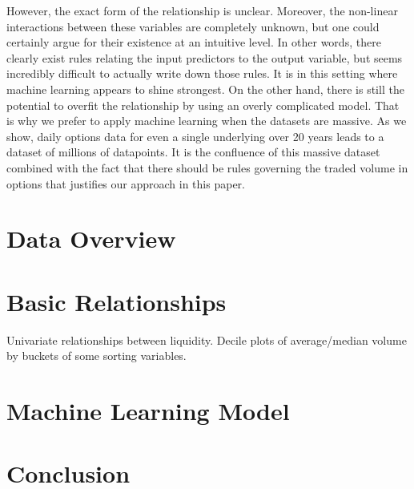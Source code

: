 \documentclass[12pt]{article}
\numberwithin{theorem}{section}
\numberwithin{equation}{section}
\numberwithin{remark}{section}
\numberwithin{definition}{section}
\numberwithin{theorem}{section}
\numberwithin{lemma}{section}
\numberwithin{example}{section}
\begin{document}
However, the exact form of the relationship is unclear. Moreover, the non-linear interactions between these variables are completely unknown, but one could certainly argue for their existence at an intuitive level. In other words, there clearly exist rules relating the input predictors to the output variable, but seems incredibly difficult to actually write down those rules. It is in this setting where machine learning appears to shine strongest. On the other hand, there is still the potential to overfit the relationship by using an overly complicated model. That is why we prefer to apply machine learning when the datasets are massive. As we show, daily options data for even a single underlying over 20 years leads to a dataset of millions of datapoints. It is the confluence of this massive dataset combined with the fact that there should be rules governing the traded volume in options that justifies our approach in this paper. 

\section{Data Overview}


\section{Basic Relationships}
Univariate relationships between liquidity. Decile plots of average/median volume by buckets of some sorting variables. 

\section{Machine Learning Model}


\section{Conclusion}
\end{document}
